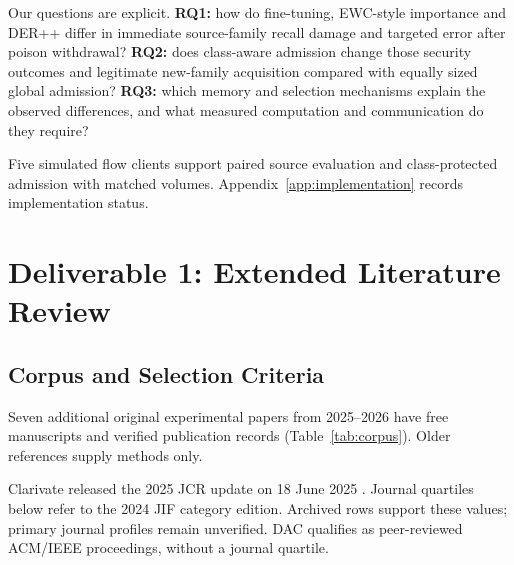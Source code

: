 \documentclass[10pt,a4paper]{article}
\begin{document}
Our questions are explicit. \textbf{RQ1:} how do fine-tuning, EWC-style importance and DER++ differ in immediate source-family recall damage and targeted error after poison withdrawal? \textbf{RQ2:} does class-aware admission change those security outcomes and legitimate new-family acquisition compared with equally sized global admission? \textbf{RQ3:} which memory and selection mechanisms explain the observed differences, and what measured computation and communication do they require?

Five simulated flow clients support paired source evaluation and class-protected admission with matched volumes. Appendix~\ref{app:implementation} records implementation status.

\section{Deliverable 1: Extended Literature Review}
\subsection{Corpus and Selection Criteria}
Seven additional original experimental papers from 2025--2026 have free manuscripts and verified publication records (Table~\ref{tab:corpus}). Older references supply methods only.

Clarivate released the 2025 JCR update on 18 June 2025 \cite{clarivate}. Journal quartiles below refer to the 2024 JIF category edition. Archived rows support these values; primary journal profiles remain unverified. DAC qualifies as peer-reviewed ACM/IEEE proceedings, without a journal quartile.
\end{document}
